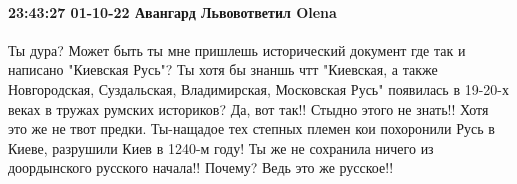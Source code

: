  
 
 
 
 

\paragraph{23:43:27 01-10-22 Авангард Львовответил Olena}

Ты дура? Может быть ты мне пришлешь исторический документ где так и написано
"Киевская Русь"? Ты хотя бы знаншь чтт "Киевская, а также Новгородская,
Суздальская, Владимирская, Московская Русь" появилась в 19-20-х веках в тружах
румских историков? Да, вот так!! Стыдно этого не знать!! Хотя это же не твот
предки. Ты-нащадое тех степных племен кои похоронили Русь в Киеве, разрушили
Киев в 1240-м году! Ты же не сохранила ничего из доордынского русского начала!!
Почему? Ведь это же русское!!
